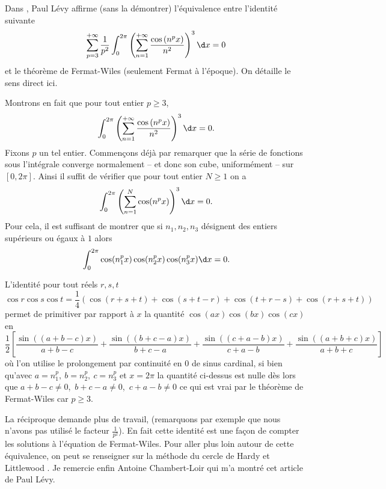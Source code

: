 \documentclass{notes}
\begin{document}

Dans \cite{Levy}, Paul Lévy affirme (sans la démontrer) l'équivalence entre l'identité suivante
\[ \sum_{p=3}^{+\infty} \frac{1}{p^{2}} \int_{0}^{2\pi} \left( \sum_{n=1}^{+\infty} \frac{\cos\left( n^{p }x \right)}{n^{2}} \right)^{3}  \d x = 0  \]
et le théorème de Fermat-Wiles (seulement Fermat à l'époque). On détaille le sens direct ici.

Montrons en fait que pour tout entier $p\geq 3$, 
\[ \int_{0}^{2\pi} \left( \sum_{n=1}^{+\infty} \frac{\cos\left( n^{p }x \right)}{n^{2}} \right)^{3}  \d x = 0 .  \]
Fixons $p$ un tel entier. Commençons déjà par remarquer que la série de fonctions sous l'intégrale converge normalement -- et donc son cube, uniformément -- sur $[0,2\pi]$. Ainsi il suffit de vérifier que pour tout entier $N\geq 1$ on a 
\[  \int_{0}^{2\pi}   \left( \sum_{n=1}^{N} \cos(n^{p}x) \right)^{3} \d x = 0. \]
Pour cela, il est suffisant de montrer que si $n_1,n_2,n_3$ désignent des entiers supérieurs ou égaux à $1$ alors 
\[ \int_{0}^{2\pi} \cos(n_1^{p} x)\cos(n_2^{p}x) \cos(n_3^{p}x) \d x = 0.\]

L'identité pour tout réels $r,s,t$ 
\[\cos r \cos s \cos t = \frac 14 \left( \cos(r+s+t)+\cos(s+t-r) + \cos(t+r-s) + \cos(r+s+t) \right)\]
permet de primitiver par rapport à $x$ la quantité $ \cos(ax)\cos(bx)\cos(cx) $  en 
\[ \frac 12 \left[    \frac{\sin \left( (a+b-c)x \right)  }{a+b-c} + \frac{\sin\left( (b+c-a)x \right)}{b+c-a}  + \frac{\sin\left( (c+a-b) x\right)  }{c+a-b} + \frac{\sin\left( (a+b+c)x \right)}{a+b+c}    \right] \]
où l'on utilise le prolongement par continuité en $0$ de sinus cardinal, si bien qu'avec $a=n_1^{p},\ b=n_2^{p},\ c=n_3^{p}$ et $x=2\pi$ la quantité ci-dessus est nulle dès lors que $a+b-c \neq 0$,\ $b+c-a \neq 0$,\ $c+a-b \neq 0$ ce qui est vrai par le théorème de Fermat-Wiles car $p \geq 3$.  


\begin{rem}
  La réciproque demande plus de travail, (remarquons par exemple que nous n'avons pas utilisé le facteur $\frac{1}{p^{2}}$). En fait cette identité est une façon de compter les solutions à l'équation de Fermat-Wiles. Pour aller plus loin autour de cette équivalence, on peut se renseigner sur la méthode du cercle de Hardy et Littlewood \cite{HW}.   Je remercie enfin Antoine Chambert-Loir qui m'a montré cet article de Paul Lévy.
\end{rem}





 
\end{document}
